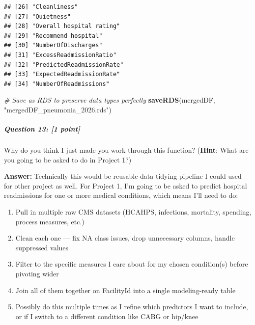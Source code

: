 \documentclass[
]{article}
\newenvironment{Shaded}{\begin{snugshade}}{\end{snugshade}}
\newcommand{\CommentTok}[1]{\textcolor[rgb]{0.56,0.35,0.01}{\textit{#1}}}
\newcommand{\FunctionTok}[1]{\textcolor[rgb]{0.13,0.29,0.53}{\textbf{#1}}}
\newcommand{\NormalTok}[1]{#1}
\newcommand{\StringTok}[1]{\textcolor[rgb]{0.31,0.60,0.02}{#1}}
\providecommand{\tightlist}{%
  \setlength{\itemsep}{0pt}\setlength{\parskip}{0pt}}
\begin{document}
\begin{verbatim}
## [26] "Cleanliness"                                                               
## [27] "Quietness"                                                                 
## [28] "Overall hospital rating"                                                   
## [29] "Recommend hospital"                                                        
## [30] "NumberOfDischarges"                                                        
## [31] "ExcessReadmissionRatio"                                                    
## [32] "PredictedReadmissionRate"                                                  
## [33] "ExpectedReadmissionRate"                                                   
## [34] "NumberOfReadmissions"
\end{verbatim}

\begin{Shaded}
\begin{Highlighting}[]
\CommentTok{\# Save as RDS to preserve data types perfectly}
\FunctionTok{saveRDS}\NormalTok{(mergedDF, }\StringTok{"mergedDF\_pneumonia\_2026.rds"}\NormalTok{)}
\end{Highlighting}
\end{Shaded}

\subparagraph{\texorpdfstring{\textbf{Question 13}: {[}1
point{]}}{Question 13: {[}1 point{]}}}\label{question-13-1-point}

Why do you think I just made you work through this function?
(\textbf{Hint}: What are you going to be asked to do in Project 1?)

\textbf{Answer:} Technically this would be reusable data tidying
pipeline I could used for other project as well. For Project 1, I'm
going to be asked to predict hospital readmissions for one or more
medical conditions, which means I'll need to do:

\begin{enumerate}
\def\labelenumi{\arabic{enumi}.}
\tightlist
\item
  Pull in multiple raw CMS datasets (HCAHPS, infections, mortality,
  spending, process measures, etc.)
\item
  Clean each one --- fix NA class issues, drop unnecessary columns,
  handle suppressed values
\item
  Filter to the specific measures I care about for my chosen
  condition(s) before pivoting wider
\item
  Join all of them together on FacilityId into a single modeling-ready
  table
\item
  Possibly do this multiple times as I refine which predictors I want to
  include, or if I switch to a different condition like CABG or hip/knee
\end{enumerate}
\end{document}
